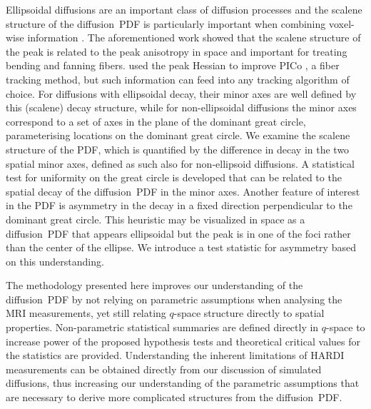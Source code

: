 \documentclass[dvips,aoas,preprint]{imsart}
\numberwithin{equation}{section}
\theoremstyle{plain}
\begin{document}
Ellipsoidal diffusions are an important class of diffusion processes
and the scalene structure of the diffusion~PDF is particularly
important when combining voxel-wise information \citep{Seunarine}.
The aforementioned work showed that the scalene structure of the peak
is related to the peak anisotropy in space and important for treating
bending and fanning fibers.  \citet{Seunarine} used the peak Hessian
to improve PICo \citep{par-ale:pico}, a fiber tracking method, but
such information can feed into any tracking algorithm of choice.  For
diffusions with ellipsoidal decay, their minor axes are well defined
by this (scalene) decay structure, while for non-ellipsoidal
diffusions the minor axes correspond to a set of axes in the plane of
the dominant great circle, parameterising locations on the dominant
great circle.  We examine the scalene structure of the PDF, which is
quantified by the difference in decay in the two spatial minor axes,
defined as such also for non-ellipsoid diffusions.
A statistical test for uniformity on the great circle is developed
that can be related to the spatial decay of the diffusion~PDF in the
minor axes.  Another feature of interest in the PDF is asymmetry in
the decay in a fixed direction perpendicular to the dominant great
circle.  This heuristic may be visualized in space as a diffusion~PDF
that appears ellipsoidal but the peak is in one of the foci rather
than the center of the ellipse.  We introduce a test statistic for
asymmetry based on this understanding.


The methodology presented here improves our understanding of the
diffusion~PDF by not relying on parametric assumptions when analysing
the MRI measurements, yet still relating $q$-space structure directly
to spatial properties.  Non-parametric statistical summaries are
defined directly in $q$-space to increase power of the proposed
hypothesis tests and theoretical critical values for the statistics
are provided.  Understanding the inherent limitations of HARDI
measurements can be obtained directly from our discussion of simulated
diffusions, thus increasing our understanding of the parametric
assumptions that are necessary to derive more complicated structures
from the diffusion~PDF.
\end{document}
